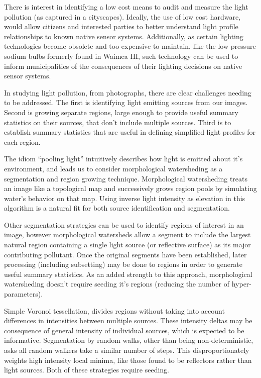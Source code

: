 \documentclass[11pt,twocolumn]{article} %
\def\rois{regions of interest\xspace}
\begin{document}
There is interest in identifying a low cost means to audit and measure the light pollution (as captured in a cityscapes). Ideally, the use of low cost hardware, would allow citizens and interested parties to better understand light profile relationships to known native sensor systems. Additionally, as certain lighting technologies become obsolete and too expensive to maintain, like the low pressure sodium bulbs formerly found in Waimea HI, such technology can be used to inform municipalities of the consequences of their lighting decisions on native sensor systems.

In studying light pollution, from photographs, there are clear challenges needing to be addressed. The first is identifying light emitting sources from our images. Second is growing separate regions, large enough to provide useful summary statistics on their sources, that don't include multiple sources. Third is to establish summary statistics that are useful in defining simplified light profiles for each region.

The idiom ``pooling light'' intuitively describes how light is emitted about it's environment, and leads us to consider morphological watersheding as a segmentation and region growing technique. Morphological watersheding treats an image like a topological map and successively grows region pools by simulating water's behavior on that map. Using inverse light intensity as elevation in this algorithm is a natural fit for both source identification and segmentation. %

Other segmentation strategies can be used to identify \rois in an image, however morphological watersheds allow a segment to include the largest natural region containing a single light source (or reflective surface) as its major contributing pollutant. Once the original segments have been established, later processing (including subsetting) may be done to regions in order to generate useful summary statistics. As an added strength to this approach, morphological watersheding doesn't require seeding it's regions (reducing the number of hyper-parameters).

Simple Voronoi tessellation, divides regions without taking into account differences in intensities between multiple sources. These intensity deltas may be consequence of general intensity of individual sources, which is expected to be informative. Segmentation by random walks, other than being non-deterministic, asks all random walkers take a similar number of steps. This disproportionately weights high intensity local minima, like those found to be reflectors rather than light sources. Both of these strategies require seeding.
\end{document}

